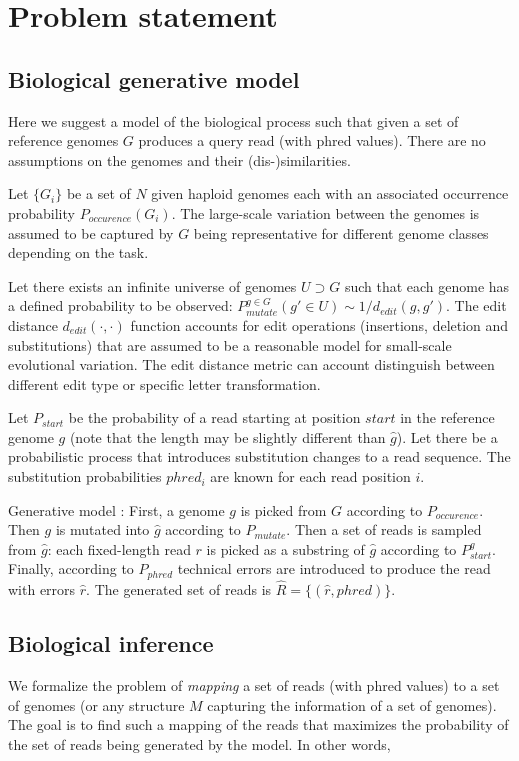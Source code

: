 \section{Problem statement}

\subsection{Biological generative model}
Here we suggest a model of the biological process such that given a set of reference genomes $G$ produces a query read (with phred values). There are no assumptions on the genomes and their (dis-)similarities.

Let $\{G_i\}$ be a set of $N$ given haploid genomes each with an associated occurrence probability $P_{occurence}(G_i)$. The large-scale variation between the genomes is assumed to be captured by $G$ being representative for different genome classes depending on the task.

Let there exists an infinite universe of genomes $U \supset G$ such that each genome has a defined probability to be observed: $P_{mutate}^{g \in G}(g' \in U) \sim 1 / d_{edit}(g, g')$. The edit distance $d_{edit}(\cdot,\cdot)$ function accounts for edit operations (insertions, deletion and substitutions) that are assumed to be a reasonable model for small-scale evolutional variation. The edit distance metric can account distinguish between different edit type or specific letter transformation.

Let $P_{start}$ be the probability of a read starting at position $start$ in the reference genome $g$ (note that the length may be slightly different than $\hat{g}$). Let there be a probabilistic process that introduces substitution changes to a read sequence. The substitution probabilities $phred_i$ are known for each read position $i$.

Generative model : First, a genome $g$ is picked from $G$ according to $P_{occurence}$. Then $g$ is mutated into $\hat{g}$ according to $P_{mutate}$. Then a set of reads is sampled from $\hat{g}$: each fixed-length read $r$ is picked as a substring of $\hat{g}$ according to $P_{start}^g$. Finally, according to $P_{phred}$ technical errors are introduced to produce the read with errors $\hat{r}$. The generated set of reads is $\hat{R} = \{ (\hat{r},phred) \}$.

\subsection{Biological inference}
We formalize the problem of \textit{mapping} a set of reads (with phred values) to a set of genomes (or any structure $M$ capturing the information of a set of genomes). The goal is to find such a mapping of the reads that maximizes the probability of the set of reads being generated by the model. In other words,


